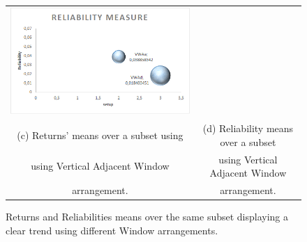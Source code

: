 \documentclass{beamer}
\begin{document}
\begin{frame}
\begin{figure}
\begin{tabular}{c c}
        \includegraphics[scale=0.5]{TrendVAReliability.png} \\
    \scriptsize (c) Returns' means over a subset using & \scriptsize (d) Reliability means over a subset\\
		\scriptsize  using Vertical Adjacent Window & \scriptsize using Vertical Adjacent Window\\
		\scriptsize arrangement. & \scriptsize arrangement.\\
		\end{tabular}	
    \caption{Returns and Reliabilities means over the same subset displaying a clear trend using different Window arrangements.}\label{fig:TrendHA}
\end{figure}
\end{frame}
\end{document}
